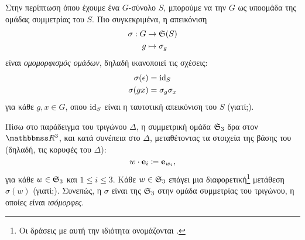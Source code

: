 \documentclass[12pt,a4paper,reqno]{amsart}
\newcommand{\defn}[1]{{\color{mylightblue}{#1}}}
\begin{document}
Στην περίπτωση όπου έχουμε ένα $G$-σύνολο $S$, μπορούμε να  την $G$ ως υποομάδα της ομάδας συμμετρίας του $S$. Πιο συγκεκριμένα, η απεικόνιση 
\begin{align*}
    \sigma : G &\rightarrow \mathfrak{S}(S) \\
    g &\mapsto \sigma_g
\end{align*}
είναι \emph{ομομορφισμός ομάδων}, δηλαδή ικανοποιεί τις σχέσεις:
\begin{align*}
    \sigma(\epsilon) &= \mathrm{id}_S \\ 
    \sigma(gx) &= \sigma_g\sigma_x
\end{align*}
για κάθε $g, x \in G$, οπου $\mathrm{id}_S$ είναι η ταυτοτική απεικόνιση του $S$ (γιατί;).

Πίσω στο παράδειγμα του τριγώνου $\Delta$, η συμμετρική ομάδα $\mathfrak{S}_3$ δρα στον $\RR^3$, και κατά συνέπεια στο $\Delta$, μεταθέτοντας τα στοιχεία της βάσης του (δηλαδή, τις κορυφές του $\Delta$):
\[
w\cdot \mathbf{e}_i \coloneqq \mathbf{e}_{w_i},
\] 
για κάθε $w\in \mathfrak{S}_3$ και $1 \le i \le 3$. Κάθε $w \in \mathfrak{S}_3$ επάγει μια διαφορετική\footnote{Οι δράσεις με αυτή την ιδιότητα ονομάζονται \defn{πιστές}.} μετάθεση $\sigma(w)$ (γιατί;). Συνεπώς, η $\sigma$ είναι  της $\mathfrak{S}_3$ στην ομάδα συμμετρίας του τριγώνου, η οποίες είναι \emph{ισόμορφες}.
\end{document}
